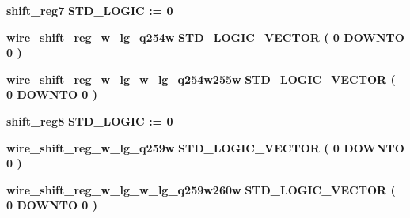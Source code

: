 \begin{DoxyCompactItemize}
\item 
{\bf shift\+\_\+reg7} {\bfseries \textcolor{comment}{S\+T\+D\+\_\+\+L\+O\+G\+IC}\textcolor{vhdlchar}{ }\textcolor{vhdlchar}{ }\textcolor{vhdlchar}{\+:}\textcolor{vhdlchar}{=}\textcolor{vhdlchar}{ }\textcolor{vhdlchar}{ }\textcolor{vhdlchar}{\textquotesingle{}}\textcolor{vhdlchar}{ } \textcolor{vhdldigit}{0} \textcolor{vhdlchar}{ }\textcolor{vhdlchar}{\textquotesingle{}}\textcolor{vhdlchar}{ }} 
\item 
{\bf wire\+\_\+shift\+\_\+reg\+\_\+w\+\_\+lg\+\_\+q254w} {\bfseries \textcolor{comment}{S\+T\+D\+\_\+\+L\+O\+G\+I\+C\+\_\+\+V\+E\+C\+T\+OR}\textcolor{vhdlchar}{ }\textcolor{vhdlchar}{(}\textcolor{vhdlchar}{ }\textcolor{vhdlchar}{ } \textcolor{vhdldigit}{0} \textcolor{vhdlchar}{ }\textcolor{keywordflow}{D\+O\+W\+N\+TO}\textcolor{vhdlchar}{ }\textcolor{vhdlchar}{ } \textcolor{vhdldigit}{0} \textcolor{vhdlchar}{ }\textcolor{vhdlchar}{)}\textcolor{vhdlchar}{ }} 
\item 
{\bf wire\+\_\+shift\+\_\+reg\+\_\+w\+\_\+lg\+\_\+w\+\_\+lg\+\_\+q254w255w} {\bfseries \textcolor{comment}{S\+T\+D\+\_\+\+L\+O\+G\+I\+C\+\_\+\+V\+E\+C\+T\+OR}\textcolor{vhdlchar}{ }\textcolor{vhdlchar}{(}\textcolor{vhdlchar}{ }\textcolor{vhdlchar}{ } \textcolor{vhdldigit}{0} \textcolor{vhdlchar}{ }\textcolor{keywordflow}{D\+O\+W\+N\+TO}\textcolor{vhdlchar}{ }\textcolor{vhdlchar}{ } \textcolor{vhdldigit}{0} \textcolor{vhdlchar}{ }\textcolor{vhdlchar}{)}\textcolor{vhdlchar}{ }} 
\item 
{\bf shift\+\_\+reg8} {\bfseries \textcolor{comment}{S\+T\+D\+\_\+\+L\+O\+G\+IC}\textcolor{vhdlchar}{ }\textcolor{vhdlchar}{ }\textcolor{vhdlchar}{\+:}\textcolor{vhdlchar}{=}\textcolor{vhdlchar}{ }\textcolor{vhdlchar}{ }\textcolor{vhdlchar}{\textquotesingle{}}\textcolor{vhdlchar}{ } \textcolor{vhdldigit}{0} \textcolor{vhdlchar}{ }\textcolor{vhdlchar}{\textquotesingle{}}\textcolor{vhdlchar}{ }} 
\item 
{\bf wire\+\_\+shift\+\_\+reg\+\_\+w\+\_\+lg\+\_\+q259w} {\bfseries \textcolor{comment}{S\+T\+D\+\_\+\+L\+O\+G\+I\+C\+\_\+\+V\+E\+C\+T\+OR}\textcolor{vhdlchar}{ }\textcolor{vhdlchar}{(}\textcolor{vhdlchar}{ }\textcolor{vhdlchar}{ } \textcolor{vhdldigit}{0} \textcolor{vhdlchar}{ }\textcolor{keywordflow}{D\+O\+W\+N\+TO}\textcolor{vhdlchar}{ }\textcolor{vhdlchar}{ } \textcolor{vhdldigit}{0} \textcolor{vhdlchar}{ }\textcolor{vhdlchar}{)}\textcolor{vhdlchar}{ }} 
\item 
{\bf wire\+\_\+shift\+\_\+reg\+\_\+w\+\_\+lg\+\_\+w\+\_\+lg\+\_\+q259w260w} {\bfseries \textcolor{comment}{S\+T\+D\+\_\+\+L\+O\+G\+I\+C\+\_\+\+V\+E\+C\+T\+OR}\textcolor{vhdlchar}{ }\textcolor{vhdlchar}{(}\textcolor{vhdlchar}{ }\textcolor{vhdlchar}{ } \textcolor{vhdldigit}{0} \textcolor{vhdlchar}{ }\textcolor{keywordflow}{D\+O\+W\+N\+TO}\textcolor{vhdlchar}{ }\textcolor{vhdlchar}{ } \textcolor{vhdldigit}{0} \textcolor{vhdlchar}{ }\textcolor{vhdlchar}{)}\textcolor{vhdlchar}{ }} 

\end{DoxyCompactItemize}
